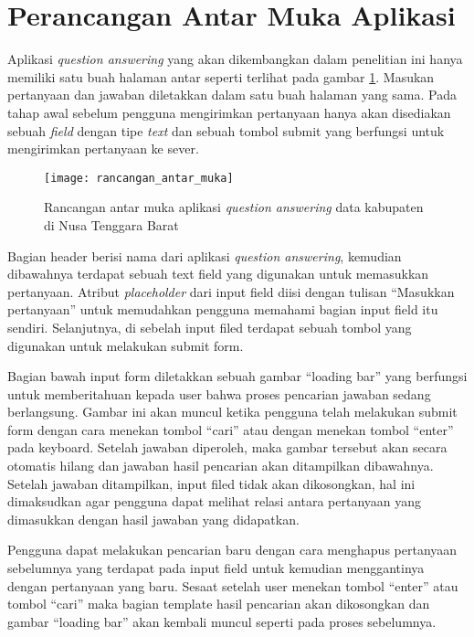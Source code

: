 \section{Perancangan Antar Muka Aplikasi}
Aplikasi \emph{question answering} yang akan dikembangkan dalam penelitian ini hanya memiliki satu buah halaman antar seperti terlihat pada gambar \ref{fig:rancangan_antarmuka}. Masukan pertanyaan dan jawaban diletakkan dalam satu buah halaman yang sama. Pada tahap awal sebelum pengguna mengirimkan pertanyaan hanya akan disediakan sebuah \emph{field} dengan tipe \emph{text} dan sebuah tombol submit yang berfungsi untuk mengirimkan pertanyaan ke sever.

\begin{figure}[hb]
    \centering
    \texttt{[image: rancangan\_antar\_muka]}
    \caption{Rancangan antar muka aplikasi \emph{question answering} data kabupaten di Nusa Tenggara Barat}
    \label{fig:rancangan_antarmuka}
\end{figure}

Bagian header berisi nama dari aplikasi \emph{question answering}, kemudian dibawahnya terdapat sebuah text field yang digunakan untuk memasukkan pertanyaan. Atribut \emph{placeholder} dari input field diisi dengan tulisan ``Masukkan pertanyaan'' untuk memudahkan pengguna memahami bagian input field itu sendiri. Selanjutnya, di sebelah input filed terdapat sebuah tombol yang digunakan untuk melakukan submit form.

Bagian bawah input form diletakkan sebuah gambar ``loading bar'' yang berfungsi untuk memberitahuan kepada user bahwa proses pencarian jawaban sedang berlangsung. Gambar ini akan muncul ketika pengguna telah melakukan submit form dengan cara menekan tombol ``cari'' atau dengan menekan tombol ``enter'' pada keyboard. Setelah jawaban diperoleh, maka gambar tersebut akan secara otomatis hilang dan jawaban hasil pencarian akan ditampilkan dibawahnya. Setelah jawaban ditampilkan, input filed tidak akan dikosongkan, hal ini dimaksudkan agar pengguna dapat melihat relasi antara pertanyaan yang dimasukkan dengan hasil jawaban yang didapatkan.

Pengguna dapat melakukan pencarian baru dengan cara menghapus pertanyaan sebelumnya yang terdapat pada input field untuk kemudian menggantinya dengan pertanyaan yang baru. Sesaat setelah user menekan tombol ``enter'' atau tombol ``cari'' maka bagian template hasil pencarian akan dikosongkan dan gambar ``loading bar'' akan kembali muncul seperti pada proses sebelumnya.